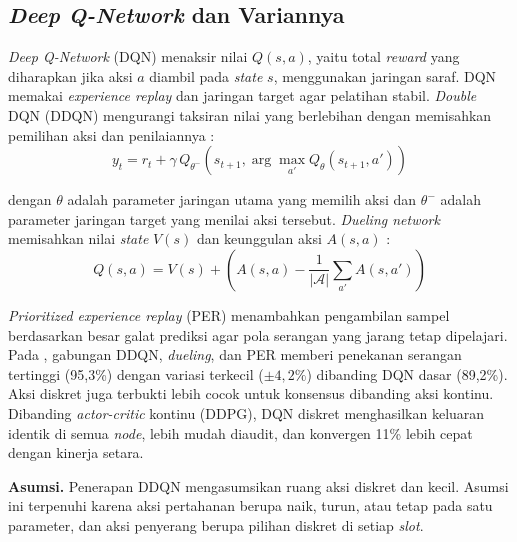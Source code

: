 \subsection{\textit{Deep Q-Network} dan Variannya}
\label{subsec:dqn}
\textit{Deep Q-Network} (DQN) menaksir nilai $Q(s,a)$, yaitu total \textit{reward} yang diharapkan jika aksi $a$ diambil pada \textit{state} $s$, menggunakan jaringan saraf. DQN memakai \textit{experience replay} dan jaringan target agar pelatihan stabil. \textit{Double} DQN (DDQN) mengurangi taksiran nilai yang berlebihan dengan memisahkan pemilihan aksi dan penilaiannya \parencite{skowronski2026adaptive}:
\begin{equation}
y_t = r_t + \gamma \, Q_{\theta^{-}}\!\left(s_{t+1}, \arg\max_{a'} Q_{\theta}(s_{t+1}, a')\right)
\label{eq:ddqn}
\end{equation}

\noindent dengan $\theta$ adalah parameter jaringan utama yang memilih aksi dan $\theta^{-}$ adalah parameter jaringan target yang menilai aksi tersebut. \textit{Dueling network} memisahkan nilai \textit{state} $V(s)$ dan keunggulan aksi $A(s,a)$ \parencite{skowronski2026adaptive}:
\begin{equation}
Q(s,a) = V(s) + \left(A(s,a) - \frac{1}{|\mathcal{A}|}\sum_{a'} A(s,a')\right)
\label{eq:dueling}
\end{equation}

\textit{Prioritized experience replay} (PER) menambahkan pengambilan sampel berdasarkan besar galat prediksi agar pola serangan yang jarang tetap dipelajari. Pada \textcite{skowronski2026adaptive}, gabungan DDQN, \textit{dueling}, dan PER memberi penekanan serangan tertinggi (95,3\%) dengan variasi terkecil ($\pm 4{,}2\%$) dibanding DQN dasar (89,2\%). Aksi diskret juga terbukti lebih cocok untuk konsensus dibanding aksi kontinu. Dibanding \textit{actor-critic} kontinu (DDPG), DQN diskret menghasilkan keluaran identik di semua \textit{node}, lebih mudah diaudit, dan konvergen 11\% lebih cepat dengan kinerja setara.

\textbf{Asumsi.} Penerapan DDQN mengasumsikan ruang aksi diskret dan kecil. Asumsi ini terpenuhi karena aksi pertahanan berupa naik, turun, atau tetap pada satu parameter, dan aksi penyerang berupa pilihan diskret di setiap \textit{slot}.

